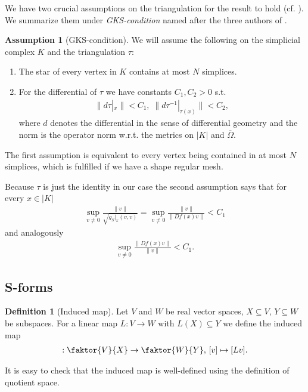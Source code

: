 \documentclass[12pt,a4paper]{article}
\numberwithin{equation}{subsection}
\numberwithin{lemma}{subsection}
\theoremstyle{definition}
\newtheorem{assumption}[lemma]{Assumption}
\newtheorem{definition}[lemma]{Definition}
\newcommand{\omegabar}{\overline{\Omega}}
\begin{document}
We have two crucial assumptions on the triangulation for the result to hold 
(cf. \cite[p.194]{goldshtein}). We summarize them under 
\textit{GKS-condition} named after the three authors of \cite{goldshtein}.

\begin{assumption}[GKS-condition]
    We will assume the following on the simplicial complex $K$ 
    and the triangulation $\tau$:
    \begin{enumerate}
    \item The star of every vertex in $K$ contains at most $N$ simplices.
    \item For the differential of $\tau$ we have constants 
        $C_1, C_2 > 0$ s.t.
        \begin{align*}
        \lVert d\tau|_x \rVert < C_1, \; 
        \lVert d\tau^{-1}|_{\tau(x)} \rVert < C_2,
        \end{align*}
        where $d$ denotes the differential in the sense of differential 
        geometry and the norm is the operator norm w.r.t. the metrics on $|K|$ 
        and $\omegabar$.
    \end{enumerate}
\end{assumption}
The first assumption is equivalent to every vertex being contained in
at most $N$ simplices, which is fulfilled if we have a shape regular mesh.\par

Because $\tau$ is just the identity in our case 
the second assumption says that for every 
$x \in |K|$
\begin{align*}
\sup\limits_{v \neq 0} \frac{\lVert v \rVert}{\sqrt{g_S|_x(v,v)}} =
\sup\limits_{v \neq 0} \frac{\lVert v \rVert}{\lVert Df(x)v\rVert} < C_1
\end{align*}
and analogously
\begin{align*}
    \sup\limits_{v \neq 0} \frac{\lVert Df(x)v\rVert}{\lVert v \rVert} < C_1.
\end{align*}

\subsection{S-forms}
\begin{definition}[Induced map]
    Let $V$ and $W$ be real vector spaces, $X \subseteq V$, $Y \subseteq W$ be 
    subspaces. For a linear map $L: V \rightarrow W$ with $L(X) \subseteq Y$ 
    we define the induced map
    \begin{align*}
        [L]: \faktor{V}{X} \rightarrow \faktor{W}{Y},\,
        [v] \mapsto [Lv].
    \end{align*}     
\end{definition}
It is easy to check that the induced map is well-defined using the
definition of quotient space. %
\end{document}
